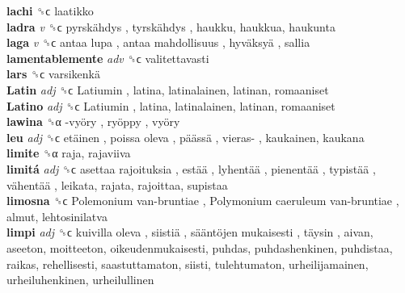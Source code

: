 \textbf{lachi} ␝ϲ  laatikko  \\
\textbf{ladra} \emph{v}  ␝ϲ   pyrskähdys ,  tyrskähdys , haukku, haukkua, haukunta  \\
\textbf{laga} \emph{v}  ␝ϲ   antaa lupa ,  antaa mahdollisuus ,  hyväksyä , sallia  \\
\textbf{lamentablemente} \emph{adv}  ␝ϲ  valitettavasti  \\
\textbf{lars} ␝ϲ   varsikenkä   \\
\textbf{Latin} \emph{adj}  ␝ϲ   Latiumin , latina, latinalainen, latinan, romaaniset  \\
\textbf{Latino} \emph{adj}  ␝ϲ   Latiumin , latina, latinalainen, latinan, romaaniset  \\
\textbf{lawina} ␝α   -vyöry ,  ryöppy ,  vyöry   \\
\textbf{leu} \emph{adj}  ␝ϲ   etäinen ,  poissa oleva ,  päässä ,  vieras- , kaukainen, kaukana  \\
\textbf{limite} ␝α  raja, rajaviiva  \\
\textbf{limitá} \emph{adj}  ␝ϲ   asettaa rajoituksia ,  estää ,  lyhentää ,  pienentää ,  typistää ,  vähentää , leikata, rajata, rajoittaa, supistaa  \\
\textbf{limosna} ␝ϲ   Polemonium van-bruntiae ,  Polymonium caeruleum van-bruntiae , almut, lehtosinilatva  \\
\textbf{limpi} \emph{adj}  ␝ϲ   kuivilla oleva ,  siistiä ,  sääntöjen mukaisesti ,  täysin , aivan, aseeton, moitteeton, oikeudenmukaisesti, puhdas, puhdashenkinen, puhdistaa, raikas, rehellisesti, saastuttamaton, siisti, tulehtumaton, urheilijamainen, urheiluhenkinen, urheilullinen  \\
